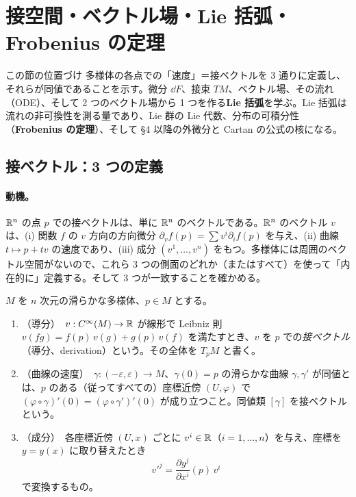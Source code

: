 \section{接空間・ベクトル場・Lie 括弧・Frobenius の定理}\label{A:sec3}
\begin{goalbox}{この節の位置づけ}
多様体の各点での「速度」＝接ベクトルを 3 通りに定義し、それらが同値であることを示す。微分 $\dd F$、接束 $TM$、ベクトル場、その流れ（ODE）、そして 2 つのベクトル場から 1 つを作る\textbf{Lie 括弧}を学ぶ。Lie 括弧は流れの非可換性を測る量であり、Lie 群の Lie 代数、分布の可積分性（\textbf{Frobenius の定理}）、そして §4 以降の外微分と Cartan の公式の核になる。
\end{goalbox}

\subsection{接ベクトル：3 つの定義}
\paragraph{動機。}$\mathbb R^n$ の点 $p$ での接ベクトルは、単に $\mathbb R^n$ のベクトルである。$\mathbb R^n$ のベクトル $v$ は、(i) 関数 $f$ の $v$ 方向の方向微分 $\partial_vf(p)=\sum v^i\partial_if(p)$ を与え、(ii) 曲線 $t\mapsto p+tv$ の速度であり、(iii) 成分 $(v^1,\dots,v^n)$ をもつ。多様体には周囲のベクトル空間がないので、これら 3 つの側面のどれか（またはすべて）を使って「内在的に」定義する。そして 3 つが一致することを確かめる。

$M$ を $n$ 次元の滑らかな多様体、$p\in M$ とする。

\begin{defn}\label{A:def:tangent}
\begin{enumerate}
\item[(A)]（導分）\ $v:C^\infty(M)\to\mathbb R$ が線形で Leibniz 則 $v(fg)=f(p)\,v(g)+g(p)\,v(f)$ を満たすとき、$v$ を $p$ での\emph{接ベクトル}（導分、derivation）という。その全体を $T_pM$ と書く。
\item[(B)]（曲線の速度）\ $\gamma:(-\varepsilon,\varepsilon)\to M$、$\gamma(0)=p$ の滑らかな曲線 $\gamma,\gamma'$ が同値とは、$p$ のある（従ってすべての）座標近傍 $(U,\varphi)$ で $(\varphi\circ\gamma)'(0)=(\varphi\circ\gamma')'(0)$ が成り立つこと。同値類 $[\gamma]$ を接ベクトルという。
\item[(C)]（成分）\ 各座標近傍 $(U,x)$ ごとに $v^i\in\mathbb R$（$i=1,\dots,n$）を与え、座標を $y=y(x)$ に取り替えたとき
\[
v'^j=\frac{\partial y^j}{\partial x^i}(p)\,v^i
\]
で変換するもの。
\end{enumerate}
\end{defn}

